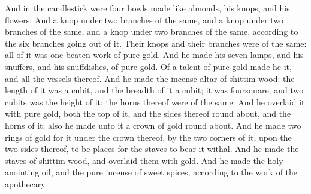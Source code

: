 \begin{biblechapter}
\verse And in the candlestick were four bowls made like almonds, his knops, and his flowers:
\verse And a knop under two branches of the same, and a knop under two branches of the same, and a knop under two branches of the same, according to the six branches going out of it.
\verse Their knops and their branches were of the same: all of it was one beaten work of pure gold.
\verse And he made his seven lamps, and his snuffers, and his snuffdishes, of pure gold.
\verse Of a talent of pure gold made he it, and all the vessels thereof.
 And he made the incense altar of shittim wood: the length of it was a cubit, and the breadth of it a cubit; it was foursquare; and two cubits was the height of it; the horns thereof were of the same.
\verse And he overlaid it with pure gold, both the top of it, and the sides thereof round about, and the horns of it: also he made unto it a crown of gold round about.
\verse And he made two rings of gold for it under the crown thereof, by the two corners of it, upon the two sides thereof, to be places for the staves to bear it withal.
\verse And he made the staves of shittim wood, and overlaid them with gold.
\verse And he made the holy anointing oil, and the pure incense of sweet spices, according to the work of the apothecary.
\end{biblechapter}

